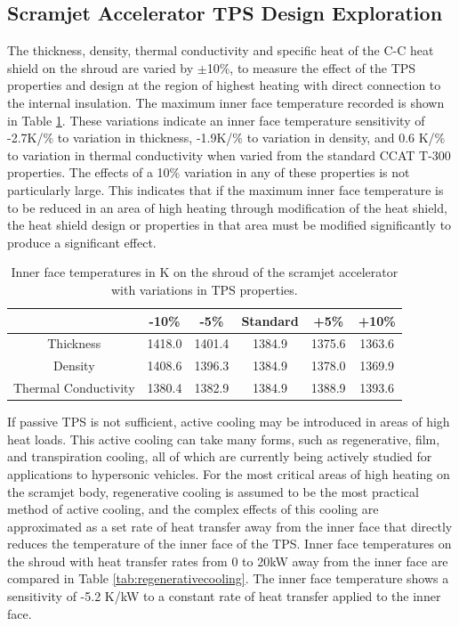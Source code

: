 \subsection{Scramjet Accelerator TPS Design Exploration}

The thickness, density, thermal conductivity and specific heat of the C-C heat shield on the shroud are varied by $\pm$10\%, to measure the effect of the TPS properties and design at the region of highest heating with direct connection to the internal insulation. The maximum inner face temperature recorded is shown in Table \ref{tab:tpsscramjet}. These variations indicate an inner face temperature sensitivity of -2.7K/\% to variation in thickness, -1.9K/\% to variation in density, and 0.6 K/\% to variation in thermal conductivity when varied from the standard CCAT T-300 properties. 
The effects of a 10\% variation in any of these properties is not particularly large. This indicates that if the maximum inner face temperature is to be reduced in an area of high heating through modification of the heat shield, the heat shield design or properties in that area must be modified significantly to produce a significant effect. 


\begin{table}[ht]
	\centering
	\begin{tabular}{|c|c|c|c|c|c|}
		\hline  & -10\% & -5\% & Standard & +5\% & +10\% \\ 
		\hline Thickness & 1418.0 & 1401.4 & 1384.9  &   1375.6&   1363.6\\ 
		\hline Density & 1408.6 &  1396.3  & 1384.9 &  1378.0&  1369.9\\ 
		\hline Thermal Conductivity &  1380.4 & 1382.9 & 1384.9 &  1388.9& 1393.6\\ 
		\hline 
	\end{tabular}
	
	\caption{Inner face temperatures in K on the shroud of the scramjet accelerator with variations in TPS properties.}
	\label{tab:tpsscramjet}
	\end{table}

If passive TPS is not sufficient, active cooling may be introduced in areas of high heat loads. This active cooling can take many forms, such as regenerative, film, and transpiration cooling\cite{Zhu2018}, all of which are currently being actively studied for applications to hypersonic vehicles. For the most critical areas of high heating on the scramjet body, regenerative cooling is assumed to be the most practical method of active cooling, and the complex effects of this cooling are approximated as a set rate of heat transfer away from the inner face that directly reduces the temperature of the inner face of the TPS. Inner face temperatures on the shroud with heat transfer rates from 0 to 20kW away from the inner face are compared in Table \ref{tab:regenerativecooling}. The inner face temperature shows a sensitivity of -5.2 K/kW to a constant rate of heat transfer applied to the inner face. 


